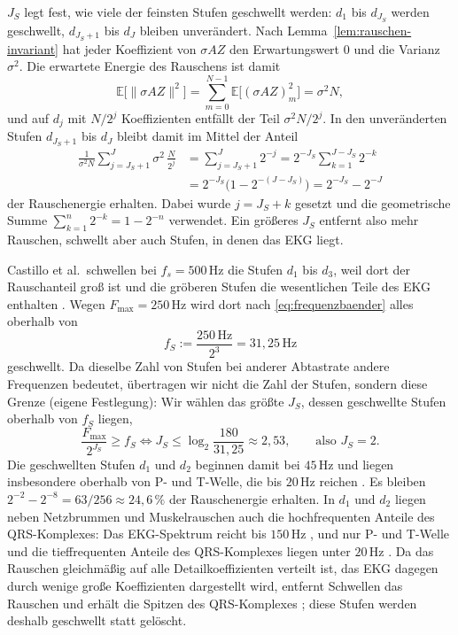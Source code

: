 \documentclass[a4paper,11pt,bibliography=totoc,listof=totoc,headinclude=true,cleardoublepage=empty,oneside]{scrbook}
\theoremstyle{plain}
\theoremstyle{definition}
\newcommand{\norm}[1]{\lVert #1 \rVert}
\begin{document}
$J_S$ legt fest, wie viele der feinsten Stufen geschwellt werden: $d_1$ bis
$d_{J_S}$ werden geschwellt, $d_{J_S+1}$ bis $d_J$ bleiben unverändert.
Nach Lemma~\ref{lem:rauschen-invariant} hat jeder Koeffizient von
$\sigma AZ$ den Erwartungswert $0$ und die Varianz $\sigma^2$. 
Die erwartete Energie des Rauschens ist damit
\[
  \mathbb E\bigl[\norm{\sigma AZ}^2\bigr]
  = \sum_{m=0}^{N-1} \mathbb E\bigl[(\sigma AZ)_m^2\bigr]
  = \sigma^2 N ,
\]
und auf $d_j$ mit 
$N/2^j$ Koeffizienten entfällt der Teil $\sigma^2 N/2^j$. In den unveränderten Stufen 
$d_{J_S+1}$ bis $d_J$ bleibt damit im Mittel der Anteil
\begin{align*}
  \frac{1}{\sigma^2 N}\sum_{j=J_S+1}^{J} \sigma^2\,\frac{N}{2^j}
  &= \sum_{j=J_S+1}^{J} 2^{-j}
   = 2^{-J_S}\sum_{k=1}^{J-J_S} 2^{-k} \\
  &= 2^{-J_S}\bigl(1 - 2^{-(J-J_S)}\bigr)
   = 2^{-J_S} - 2^{-J}
\end{align*}
der Rauschenergie erhalten. Dabei wurde $j = J_S + k$ gesetzt und die
geometrische Summe $\sum_{k=1}^{n} 2^{-k} = 1 - 2^{-n}$ verwendet.
Ein grö\ss eres $J_S$ entfernt also mehr Rauschen,
schwellt aber auch Stufen, in denen das EKG liegt.

Castillo et al.\ schwellen bei $f_s = 500$\,Hz die Stufen $d_1$ bis $d_3$,
weil dort der Rauschanteil gro\ss{} ist und die gröberen Stufen die
wesentlichen Teile des EKG enthalten \cite[Abschn.~3.1.3]{castillo}. %
Wegen $F_{\max} = 250$\,Hz wird dort nach \eqref{eq:frequenzbaender} alles
oberhalb von
\[
  f_S := \frac{250\,\mathrm{Hz}}{2^3} = 31{,}25\,\mathrm{Hz}
\]
geschwellt.
Da dieselbe Zahl von Stufen bei anderer Abtastrate andere Frequenzen
bedeutet, übertragen wir nicht die Zahl der Stufen, sondern diese Grenze
(eigene Festlegung): Wir wählen das grö\ss te $J_S$, dessen geschwellte
Stufen oberhalb von $f_S$ liegen,
\[
  \frac{F_{\max}}{2^{J_S}} \ge f_S
  \iff J_S \le \log_2\frac{180}{31{,}25} \approx 2{,}53,
  \qquad\text{also } J_S = 2 .
\]
Die geschwellten Stufen $d_1$ und $d_2$ beginnen damit bei $45$\,Hz und
liegen insbesondere oberhalb von P- und T-Welle, die bis $20$\,Hz reichen
\cite[Kap.~2.3.1]{rebstadt}. %
Es bleiben $2^{-2} - 2^{-8} = 63/256 \approx 24{,}6\,\%$ der
Rauschenergie erhalten.
In $d_1$ und $d_2$ liegen neben Netzbrummen und Muskelrauschen auch die
hochfrequenten Anteile des QRS-Komplexes: Das EKG-Spektrum reicht bis
$150$\,Hz \cite[Kap.~2.4.3.2]{gacek}, %
und nur P- und T-Welle und die tieffrequenten Anteile des QRS-Komplexes
liegen unter $20$\,Hz \cite[Kap.~2.3.1]{rebstadt}. %
Da das Rauschen gleichmä\ss ig auf alle Detailkoeffizienten verteilt ist, das
EKG dagegen durch wenige gro\ss e Koeffizienten dargestellt wird, entfernt
Schwellen das Rauschen und erhält die Spitzen des QRS-Komplexes
\cite[Abschn.~2.2.2]{castillo}; %
diese Stufen werden deshalb geschwellt statt gelöscht.
\end{document}
